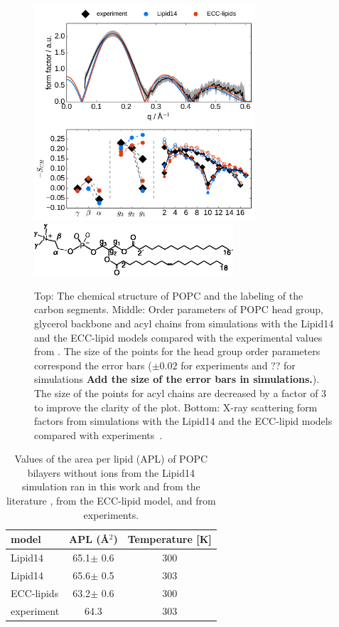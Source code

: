 \documentclass[aip,jcp,twocolumn]{revtex4}
\begin{document}
\begin{figure}[tbp]
  \centering
  \includegraphics[width=8.2cm]{../Fig/ipython_nb/Order-parameters_form-factors_exp-L14-ECCL17_q80_sig89.pdf}
  \includegraphics[width=7.4cm]{../Fig/POPCstructure.eps}
  \caption{\label{simVSexpNOions}
    Top: The chemical structure of POPC and the labeling of the carbon segments.
    Middle: Order parameters of POPC head group, glycerol backbone and acyl chains 
    from simulations with the Lipid14 \cite{dickson14} and the ECC-lipid models
    compared with the experimental values from \cite{ferreira13}.
    The size of the points for the head group order parameters correspond 
    the error bars ($\pm 0.02$ for experiments \cite{botan15,ollila16} and ?? for
    simulations {\bf Add the size of the error bars in simulations.}).
    The size of the points for acyl chains are decreased by a factor of 3 to improve the clarity of the plot.
    Bottom: X-ray scattering form factors from simulations with the Lipid14 \cite{dickson14} and
    the ECC-lipid models compared with experiments~\cite{Kucerka2011}.
  } 
\end{figure}

\begin{table}
  \caption{Values of the area per lipid (APL) of POPC bilayers without ions from the Lipid14 simulation
    ran in this work and from the literature \cite{dickson14}, from the ECC-lipid model, and from experiments.\label{tab:apls} }
  \begin{tabular}{l|c c}
    model          & APL (\AA$^2$)   & Temperature [K] \\
    \hline
    Lipid14                   & 65.1$\pm$ 0.6  &  300 \\
    Lipid14 \cite{dickson14}  & 65.6$\pm$ 0.5  &  303 \\
    \hline
    ECC-lipids                & 63.2$\pm$ 0.6  &  300       \\
    \hline
    experiment \cite{kucerka11} & 64.3  &  303    \\
    \hline
  \end{tabular}
\end{table}
\end{document}
